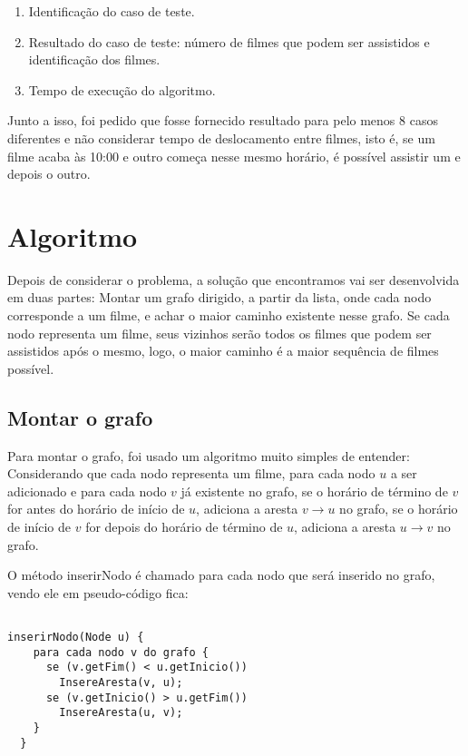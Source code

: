 \documentclass[12pt]{article}
\begin{document}
\begin{enumerate}

\item Identificação do caso de teste.

\item Resultado do caso de teste: número de filmes que podem ser assistidos e identificação dos filmes.

\item Tempo de execução do algoritmo.

\end{enumerate}

Junto a isso, foi pedido que fosse fornecido resultado para pelo menos 8 casos diferentes e não considerar tempo de deslocamento entre filmes, isto é, se um filme acaba às 10:00 e outro começa nesse mesmo horário, é possível assistir um e depois o outro.

\section{Algoritmo}

Depois de considerar o problema, a solução que encontramos vai ser desenvolvida em duas partes: Montar um grafo dirigido, a partir da lista, onde cada nodo corresponde a um filme, e achar o maior caminho existente nesse grafo. Se cada nodo representa um filme, seus vizinhos serão todos os filmes que podem ser assistidos após o mesmo, logo, o maior caminho é a maior sequência de filmes possível.

\subsection{Montar o grafo}

Para montar o grafo, foi usado um algoritmo muito simples de entender: Considerando que cada nodo representa um filme, para cada nodo $u$ a ser adicionado e para cada nodo $v$ já existente no grafo, se o horário de término de $v$ for antes do horário de início de $u$, adiciona a aresta $v \rightarrow u$ no grafo, se o horário de início de $v$ for depois do horário de término de $u$, adiciona a aresta $u \rightarrow v$ no grafo.

O método inserirNodo é chamado para cada nodo que será inserido no grafo, vendo ele em pseudo-código fica:

\begin{lstlisting}

inserirNodo(Node u) {
    para cada nodo v do grafo {
      se (v.getFim() < u.getInicio())
        InsereAresta(v, u);
      se (v.getInicio() > u.getFim())
        InsereAresta(u, v);
    }
  }

\end{lstlisting}
\end{document}
